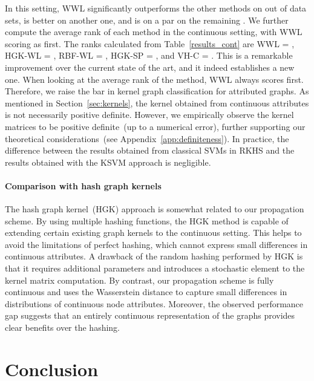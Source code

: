 \documentclass{article}
\begin{document}
In this setting, WWL significantly outperforms the other methods on  out of  data sets, is better on another one, and is on a par on the remaining . We further compute the average rank of each method in the continuous setting, with WWL scoring as first. The ranks calculated from Table~\ref{results_cont} are WWL = , HGK-WL = , RBF-WL = , HGK-SP = , and VH-C = .  This is a remarkable improvement over the current state of the art, and it indeed establishes a new one. When looking at the average rank of the method, WWL always scores first. Therefore, we raise the bar in kernel graph classification for attributed graphs. As mentioned in Section~\ref{sec:kernels}, the kernel obtained from continuous attributes is not necessarily positive definite. However, we empirically observe the kernel matrices to be positive definite~(up to a numerical error), further supporting our theoretical considerations~(see Appendix~\ref{app:definiteness}).
In practice, the difference between the results obtained from classical SVMs in RKHS and the results obtained with the KSVM approach is negligible.

\paragraph{Comparison with hash graph kernels }
The hash graph kernel~(HGK) approach is somewhat related to our propagation scheme. By using multiple hashing functions, the HGK method is capable of extending certain existing graph kernels to the continuous setting. This helps to avoid the limitations of perfect hashing, which cannot express small differences in continuous attributes. A drawback of the random hashing performed by HGK is that it requires additional parameters and introduces a stochastic element to the kernel matrix computation. By contrast, our propagation scheme is fully continuous and uses the Wasserstein distance to capture small differences in distributions of continuous node attributes. Moreover, the observed performance gap suggests that an entirely continuous representation of the graphs provides clear benefits over the hashing.


\section{Conclusion}
\label{sec:conclusion}
\end{document}
